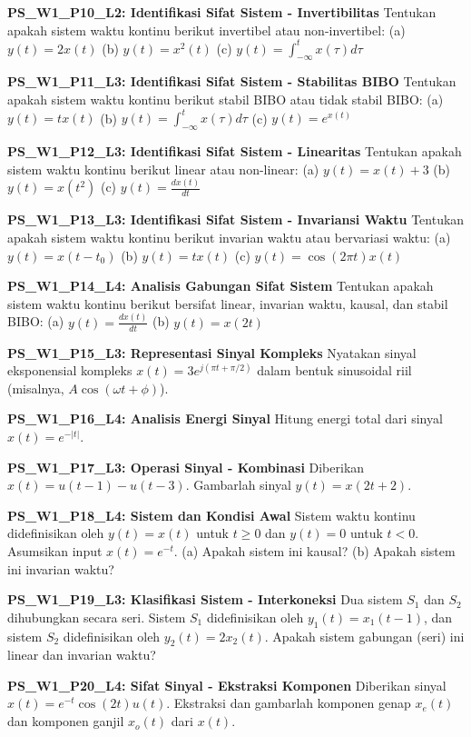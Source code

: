 \documentclass[
  letterpaper,
  DIV=11,
  numbers=noendperiod]{scrreprt}
\begin{document}
\textbf{PS\_W1\_P10\_L2: Identifikasi Sifat Sistem - Invertibilitas}
Tentukan apakah sistem waktu kontinu berikut invertibel atau
non-invertibel: (a) \(y(t) = 2x(t)\) (b) \(y(t) = x^2(t)\) (c)
\(y(t) = \int_{-\infty}^{t} x(\tau) d\tau\)

\textbf{PS\_W1\_P11\_L3: Identifikasi Sifat Sistem - Stabilitas BIBO}
Tentukan apakah sistem waktu kontinu berikut stabil BIBO atau tidak
stabil BIBO: (a) \(y(t) = t x(t)\) (b)
\(y(t) = \int_{-\infty}^{t} x(\tau) d\tau\) (c) \(y(t) = e^{x(t)}\)

\textbf{PS\_W1\_P12\_L3: Identifikasi Sifat Sistem - Linearitas}
Tentukan apakah sistem waktu kontinu berikut linear atau non-linear: (a)
\(y(t) = x(t) + 3\) (b) \(y(t) = x(t^2)\) (c)
\(y(t) = \frac{dx(t)}{dt}\)

\textbf{PS\_W1\_P13\_L3: Identifikasi Sifat Sistem - Invariansi Waktu}
Tentukan apakah sistem waktu kontinu berikut invarian waktu atau
bervariasi waktu: (a) \(y(t) = x(t-t_0)\) (b) \(y(t) = t x(t)\) (c)
\(y(t) = \cos(2\pi t) x(t)\)

\textbf{PS\_W1\_P14\_L4: Analisis Gabungan Sifat Sistem} Tentukan apakah
sistem waktu kontinu berikut bersifat linear, invarian waktu, kausal,
dan stabil BIBO: (a) \(y(t) = \frac{dx(t)}{dt}\) (b) \(y(t) = x(2t)\)

\textbf{PS\_W1\_P15\_L3: Representasi Sinyal Kompleks} Nyatakan sinyal
eksponensial kompleks \(x(t) = 3e^{j(\pi t + \pi/2)}\) dalam bentuk
sinusoidal riil (misalnya, \(A \cos(\omega t + \phi)\)).

\textbf{PS\_W1\_P16\_L4: Analisis Energi Sinyal} Hitung energi total
dari sinyal \(x(t) = e^{-|t|}\).

\textbf{PS\_W1\_P17\_L3: Operasi Sinyal - Kombinasi} Diberikan
\(x(t) = u(t-1) - u(t-3)\). Gambarlah sinyal \(y(t) = x(2t+2)\).

\textbf{PS\_W1\_P18\_L4: Sistem dan Kondisi Awal} Sistem waktu kontinu
didefinisikan oleh \(y(t) = x(t)\) untuk \(t \ge 0\) dan \(y(t) = 0\)
untuk \(t < 0\). Asumsikan input \(x(t) = e^{-t}\). (a) Apakah sistem
ini kausal? (b) Apakah sistem ini invarian waktu?

\textbf{PS\_W1\_P19\_L3: Klasifikasi Sistem - Interkoneksi} Dua sistem
\(S_1\) dan \(S_2\) dihubungkan secara seri. Sistem \(S_1\)
didefinisikan oleh \(y_1(t) = x_1(t-1)\), dan sistem \(S_2\)
didefinisikan oleh \(y_2(t) = 2x_2(t)\). Apakah sistem gabungan (seri)
ini linear dan invarian waktu?

\textbf{PS\_W1\_P20\_L4: Sifat Sinyal - Ekstraksi Komponen} Diberikan
sinyal \(x(t) = e^{-t} \cos(2t) u(t)\). Ekstraksi dan gambarlah komponen
genap \(x_e(t)\) dan komponen ganjil \(x_o(t)\) dari \(x(t)\).
\end{document}
